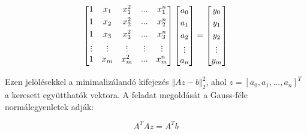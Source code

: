 \documentclass[margin=0px]{article}
\begin{document}
\begin{displaymath}
    \begin{bmatrix}
        1                             & x_{1}                         & x_{1}^{2}                     & ...                           & x_{1}^{n}                     \\[0.3em]
        1                             & x_{2}                         & x_{2}^{2}                     & ...                           & x_{2}^{n}                     \\[0.3em]
        1                             & x_{3}                         & x_{3}^{2}                     & ...                           & x_{3}^{n}                     \\[0.3em]
        \rotatebox[origin=c]{90}{...} & \rotatebox[origin=c]{90}{...} & \rotatebox[origin=c]{90}{...} & \rotatebox[origin=c]{90}{...} & \rotatebox[origin=c]{90}{...} \\[0.3em]
        1                             & x_{m}                         & x_{m}^{2}                     & ...                           & x_{m}^{n}                     \\[0.3em]
    \end{bmatrix}
    \begin{bmatrix}
        a_{0}                         \\[0.3em]
        a_{1}                         \\[0.3em]
        a_{2}                         \\[0.3em]
        \rotatebox[origin=c]{90}{...} \\[0.3em]
        a_{n}
    \end{bmatrix}
    =
    \begin{bmatrix}
        y_{0}                         \\[0.3em]
        y_{1}                         \\[0.3em]
        y_{2}                         \\[0.3em]
        \rotatebox[origin=c]{90}{...} \\[0.3em]
        y_{m}
    \end{bmatrix}
\end{displaymath}

Ezen jelölésekkel a minimalizálandó kifejezés $\Vert Az - b \Vert_{2}^{2}$, ahol $z = [a_{0},a_{1}, ..., a_{n}]^{T}$
a keresett együtthatók vektora. A feladat megoldását a Gauss-féle normálegyenletek adják:

\begin{displaymath}
    A^{T}Az = A^{T}b
\end{displaymath}
\end{document}
